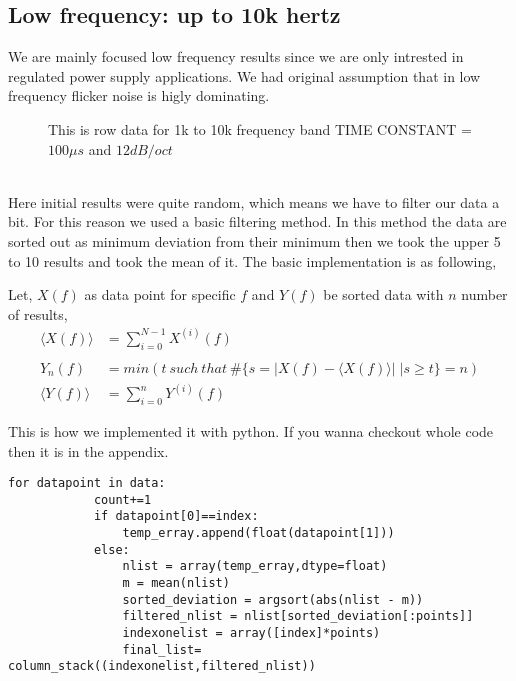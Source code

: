 \documentclass[draft,12pt]{article}
\begin{document}
\subsection{Low frequency: up to 10k hertz}

We are mainly focused low frequency results since we are only intrested in regulated power supply applications. We had original assumption that in low frequency flicker noise is higly dominating.

\begin{figure}[hbt!]
\caption{This is row data for 1k to 10k frequency band TIME CONSTANT = $100\mu s$ and $12dB/oct$}
\end{figure}\\

Here initial results were quite random, which means we have to filter our data a bit. For this reason we used a basic filtering method. In this method the data are sorted out as minimum deviation from their minimum then we took the upper 5 to 10 results and took the mean of it. The basic implementation is as following,

Let, $X(f)$ as data point for specific $f$ and $Y(f)$ be sorted data with $n$ number of results,
\begin{align*}
\langle X(f) \rangle & = \sum_{i=0}^{N-1} X^{(i)}(f)\\
\\
Y_n(f) & = min(t\: such\: that\: \# \{ s = \lvert X(f)- \langle X(f)\rangle \rvert \; | s \geq t \} =n)\\
\langle Y(f) \rangle & = \sum_{i=0}^{n} Y^{(i)}(f)
\end{align*}

This is how we implemented it with python. If you wanna checkout whole code then it is in the appendix.

\begin{verbatim}
for datapoint in data:
            count+=1
            if datapoint[0]==index:
                temp_erray.append(float(datapoint[1]))
            else:
                nlist = array(temp_erray,dtype=float)
                m = mean(nlist)
                sorted_deviation = argsort(abs(nlist - m))
                filtered_nlist = nlist[sorted_deviation[:points]]
                indexonelist = array([index]*points)
                final_list= column_stack((indexonelist,filtered_nlist))

\end{verbatim}
\end{document}

